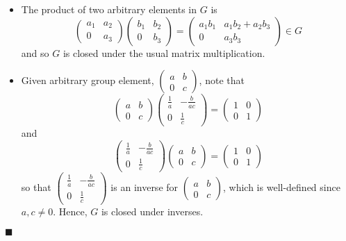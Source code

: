 \documentclass[12pt]{article}
\renewcommand{\qed}{\hfill$\blacksquare$}
\renewenvironment{proof}{\begin{addmargin}[1em]{0em}\begin{newproof}}{\end{newproof}\end{addmargin}\qed}
\begin{document}
\begin{proof}
\begin{itemize}
    \item The product of two arbitrary elements in $G$ is
    $$ \left(\begin{array}{cc} a_1 & a_2 \\ 0 & a_3 \end{array}\right)\left(\begin{array}{cc} b_1 & b_2 \\ 0 & b_3 \end{array}\right) = \left(\begin{array}{cc} a_1 b_1 & a_1b_2+a_2b_3 \\ 0 & a_3b_3 \end{array}\right) \in G $$ and so $G$ is closed under the usual matrix multiplication.
    \item Given arbitrary group element, $\left(\begin{array}{cc} a & b \\ 0 & c \end{array}\right)$, note that
    $$ \left(\begin{array}{cc} a & b \\ 0 & c \end{array}\right)\left(\begin{array}{cc} \frac{1}{a} & -\frac{b}{ac} \\ 0 & \frac{1}{c} \end{array}\right) = \left(\begin{array}{cc} 1 & 0 \\ 0 & 1\end{array}\right)$$ and
    $$ \left(\begin{array}{cc} \frac{1}{a} & -\frac{b}{ac} \\ 0 & \frac{1}{c} \end{array}\right)\left(\begin{array}{cc} a & b \\ 0 & c \end{array}\right)=\left(\begin{array}{cc} 1 & 0 \\ 0 & 1 \end{array}\right)$$ so that $\left( \begin{array}{cc} \frac{1}{a} & -\frac{b}{ac} \\ 0 & \frac{1}{c} \end{array}\right)$ is an inverse for $\left(\begin{array}{cc} a & b \\ 0 & c \end{array}\right)$, which is well-defined since $a,c\neq 0$. Hence, $G$ is closed under inverses.

\end{itemize}
\end{proof}
\end{document}

